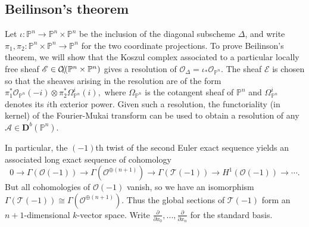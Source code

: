 \documentclass[a4paper]{article}
\theoremstyle{definition}
\theoremstyle{remark}
\newcommand{\deri}{\mathbf{D}}
\newcommand{\Pn}{\ensuremath{{\mathbb{P}^n}}}
\DeclareMathOperator{\coh}{\mathcal{C\kern -2pt o\kern -2pt h\kern -1pt}}
\begin{document}
\subsection{Beilinson's theorem}

Let \(\iota: \Pn \rightarrow \Pn\times \Pn\) be the inclusion of the diagonal
subscheme \(\Delta\), and write \(\pi_1, \pi_2:\Pn \times \Pn \rightarrow \Pn\)
for the two coordinate projections. To prove Beilinson's theorem, we will show
that the Koszul complex associated to a particular locally free sheaf
\(\mathscr{E}\in \coh (\Pn\times \Pn)\) gives a resolution of
\(\mathscr{O}_\Delta =\iota_\ast \mathscr{O}_\Pn\). The sheaf \(\mathscr{E}\) is
chosen so that the sheaves arising in the resolution are of the form
\(\pi_1^\ast\mathscr{O}_\Pn(-i)\otimes \pi_2^\ast\Omega_\Pn^i(i),\) where
\(\Omega_\Pn\) is the cotangent sheaf of \(\Pn\) and \(\Omega_\Pn^i\) denotes
its \(i\)th exterior power. Given such a resolution, the functoriality (in
kernel) of the Fourier-Mukai transform can be used to obtain a resolution of any
\(\mathscr{A}\in\deri^b(\Pn)\).

In particular, the \((-1)\)th twist of the second Euler
exact sequence yields an associated long exact sequence of cohomology
\[0\rightarrow \Gamma(\mathscr{O}(-1)) \rightarrow
    \Gamma(\mathscr{O}^{\oplus(n+1)}) \rightarrow \Gamma(\mathscr{T}(-1))
    \rightarrow H^1(\mathscr{O}(-1)) \rightarrow \cdots.
\] 
But all cohomologies of \(\mathscr{O}(-1)\) vanish, so we have an isomorphism
\(\Gamma(\mathscr{T}(-1))\cong \Gamma(\mathscr{O}^{\oplus(n+1)})\). Thus the
global sections of \(\mathscr{T}(-1)\) form an \(n+1\)-dimensional \(k\)-vector
space. Write \(\frac{\partial}{\partial x_0},...,\frac{\partial}{\partial x_n}\)
for the standard basis.
\end{document}
